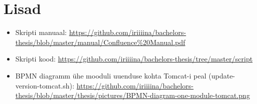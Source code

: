 \documentclass[12pt]{report}
\begin{document}
  \newpage
  
  \section*{Lisad}
  \label{lisad}
  
  \begin{itemize}
  
    \item Skripti manuaal: \url{https://github.com/iriiiina/bachelors-thesis/blob/master/manual/Confluence%20Manual.pdf}
    
    \item Skripti kood: \url{https://github.com/iriiiina/bachelors-thesis/tree/master/script}
  
    \item BPMN diagramm ühe mooduli uuenduse kohta Tomcat-i peal (update-version-tomcat.sh): \url{https://github.com/iriiiina/bachelors-thesis/blob/master/thesis/pictures/BPMN-diagram-one-module-tomcat.png}
  
  \end{itemize}
\end{document}
